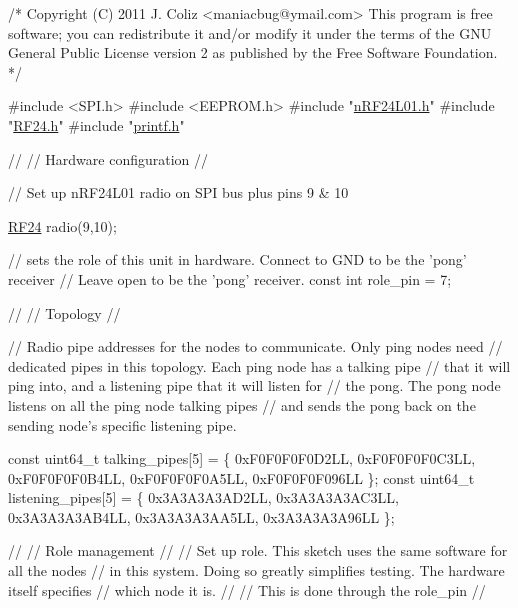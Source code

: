 \begin{DoxyCodeInclude}
\textcolor{comment}{/*}
\textcolor{comment}{ Copyright (C) 2011 J. Coliz <maniacbug@ymail.com>}
\textcolor{comment}{}
\textcolor{comment}{ This program is free software; you can redistribute it and/or}
\textcolor{comment}{ modify it under the terms of the GNU General Public License}
\textcolor{comment}{ version 2 as published by the Free Software Foundation.}
\textcolor{comment}{ */}

\textcolor{preprocessor}{#include <SPI.h>}
\textcolor{preprocessor}{#include <EEPROM.h>}
\textcolor{preprocessor}{#include "\hyperlink{nRF24L01_8h}{nRF24L01.h}"}
\textcolor{preprocessor}{#include "\hyperlink{RF24_8h}{RF24.h}"}
\textcolor{preprocessor}{#include "\hyperlink{printf_8h}{printf.h}"}

\textcolor{comment}{//}
\textcolor{comment}{// Hardware configuration}
\textcolor{comment}{//}

\textcolor{comment}{// Set up nRF24L01 radio on SPI bus plus pins 9 & 10}

\hyperlink{classRF24}{RF24} radio(9,10);

\textcolor{comment}{// sets the role of this unit in hardware.  Connect to GND to be the 'pong' receiver}
\textcolor{comment}{// Leave open to be the 'pong' receiver.}
\textcolor{keyword}{const} \textcolor{keywordtype}{int} role\_pin = 7;

\textcolor{comment}{//}
\textcolor{comment}{// Topology}
\textcolor{comment}{//}

\textcolor{comment}{// Radio pipe addresses for the nodes to communicate.  Only ping nodes need}
\textcolor{comment}{// dedicated pipes in this topology.  Each ping node has a talking pipe}
\textcolor{comment}{// that it will ping into, and a listening pipe that it will listen for}
\textcolor{comment}{// the pong.  The pong node listens on all the ping node talking pipes}
\textcolor{comment}{// and sends the pong back on the sending node's specific listening pipe.}

\textcolor{keyword}{const} uint64\_t talking\_pipes[5] = \{ 0xF0F0F0F0D2LL, 0xF0F0F0F0C3LL, 0xF0F0F0F0B4LL, 0xF0F0F0F0A5LL, 
      0xF0F0F0F096LL \};
\textcolor{keyword}{const} uint64\_t listening\_pipes[5] = \{ 0x3A3A3A3AD2LL, 0x3A3A3A3AC3LL, 0x3A3A3A3AB4LL, 0x3A3A3A3AA5LL, 
      0x3A3A3A3A96LL \};

\textcolor{comment}{//}
\textcolor{comment}{// Role management}
\textcolor{comment}{//}
\textcolor{comment}{// Set up role.  This sketch uses the same software for all the nodes}
\textcolor{comment}{// in this system.  Doing so greatly simplifies testing.  The hardware itself specifies}
\textcolor{comment}{// which node it is.}
\textcolor{comment}{//}
\textcolor{comment}{// This is done through the role\_pin}
\textcolor{comment}{//}


\end{DoxyCodeInclude}
